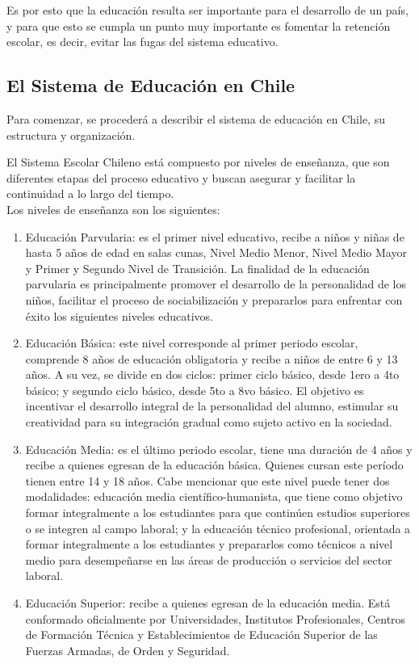 Es por esto que la educación resulta ser importante para el desarrollo de un país, y para que esto se cumpla un punto muy importante es fomentar la retención escolar, es decir, evitar las fugas del sistema educativo. 

\subsection{El Sistema de Educación en Chile}
Para comenzar, se procederá a describir el sistema de educación en Chile, su estructura y organización.

El Sistema Escolar Chileno está compuesto por niveles de enseñanza, que son diferentes etapas del proceso educativo y buscan asegurar y facilitar la continuidad a lo largo del tiempo. \\

Los niveles de enseñanza son los siguientes:

\begin{enumerate}
    \item Educación Parvularia: es el primer nivel educativo, recibe a niños y niñas de hasta 5 años de edad en salas cunas, Nivel Medio Menor, Nivel Medio Mayor y Primer y Segundo  Nivel de Transición. 
    La finalidad de la educación parvularia es principalmente promover el desarrollo de la personalidad de los niños, facilitar el proceso de sociabilización y prepararlos para enfrentar con éxito los siguientes niveles educativos.
    \item Educación Básica: este nivel corresponde al primer periodo escolar, comprende 8 años de educación obligatoria y recibe a niños de entre 6 y 13 años. A su vez, se divide en dos ciclos: primer ciclo básico, desde 1ero a 4to básico; y segundo ciclo básico, desde 5to a 8vo básico.
    El objetivo es incentivar el desarrollo integral de la personalidad del alumno, estimular su creatividad para su integración gradual como sujeto activo en la sociedad.
    \item Educación Media: es el último periodo escolar, tiene una duración de 4 años y recibe a quienes egresan de la educación básica. Quienes cursan este período tienen entre 14 y 18 años. Cabe mencionar que este nivel puede tener dos modalidades: educación media científico-humanista, que tiene como objetivo formar integralmente a los estudiantes para que continúen estudios superiores o se integren al campo laboral; y la educación técnico profesional, orientada a formar integralmente a los estudiantes y prepararlos como técnicos a nivel medio para desempeñarse en las áreas de producción o servicios del sector laboral.
    \item Educación Superior: recibe a quienes egresan de la educación media. Está conformado oficialmente por Universidades, Institutos Profesionales, Centros de Formación Técnica y Establecimientos de Educación Superior de las Fuerzas Armadas, de Orden y Seguridad. 
\end{enumerate}

